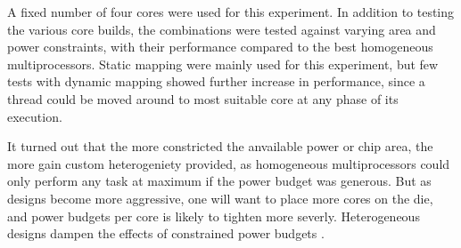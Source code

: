 A fixed number of four cores were used for this experiment.
In addition to testing the various core builds, the combinations were tested against varying area and power constraints, with their performance compared to the best homogeneous multiprocessors.
Static mapping were mainly used for this experiment, but few tests with dynamic mapping showed further increase in performance, since a thread could be moved around to most suitable core at any phase of its execution. 



It turned out that the more constricted the anvailable power or chip area, the more gain custom heterogeniety provided, as homogeneous multiprocessors could only perform any task at maximum if the power budget was generous.
But as designs become more aggressive, one will want to place more cores on the die, and power budgets per core is likely to tighten more severly.
Heterogeneous designs dampen the effects of constrained power budgets \cite{heterogeneous-arch}.

